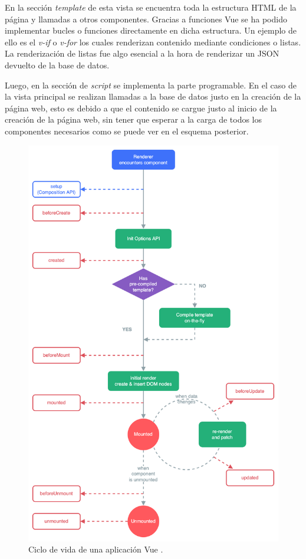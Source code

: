 En la sección \textit{template} de esta vista se encuentra toda la estructura HTML de la página y llamadas a otros componentes. Gracias a funciones Vue se ha podido implementar bucles o funciones directamente en dicha estructura. Un ejemplo de ello es el \textit{v-if} o \textit{v-for} los cuales renderizan contenido mediante condiciones o listas. La renderización de listas fue algo esencial a la hora de renderizar un \ac{JSON} devuelto de la base de datos.

\vspace{0.3cm}

Luego, en la sección de \textit{script} se implementa la parte programable. En el caso de la vista principal se realizan llamadas a la base de datos justo en la creación de la página web, esto es debido a que el contenido se cargue justo al inicio de la creación de la página web, sin tener que esperar a la carga de todos los componentes necesarios como se puede ver en el esquema posterior.

\begin{figure}[H]
    \centering
    \myfloatalign
    \includegraphics[width=1\textwidth]{gfx/lifecyclevue.png}
    \caption[Ciclo de vida de una aplicación Vue]{Ciclo de vida de una aplicación Vue \cite{vue-life}.}\label{gfx:lifecyclevue}
\end{figure}

